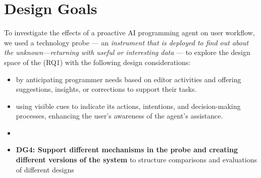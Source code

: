 \section{Design Goals}
To investigate the effects of a proactive AI programming agent on user workflow, we used a technology probe ---  an \textit{instrument that is deployed to find out about the unknown—returning with useful or interesting data} \cite{hutchinson2003techprobe} --- to explore the design space of the  (RQ1) with the following design considerations:

\begin{itemize}
    \item \textbf{} by anticipating programmer needs based on editor activities and offering suggestions, insights, or corrections to support their tasks.
    \item \textbf{} using visible cues to indicate its actions, intentions, and decision-making processes, enhancing the user's awareness of the agent's assistance.
    \item {}
    \item \textbf{DG4: Support different mechanisms in the probe and creating different versions of the system} to structure comparisons and evaluations of different designs
    
\end{itemize}


